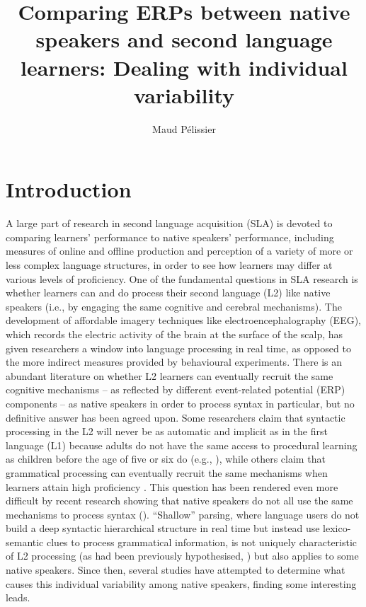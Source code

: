 \documentclass[output=paper,colorlinks,citecolor=brown,modfonts,nonflat]{../langscibook}
\author{Maud Pélissier\affiliation{University of Agder}\orcid{}}
\title{Comparing ERPs between native speakers and second language learners: Dealing with individual variability}
\begin{document}
\maketitle 
{}

\section{Introduction}
A large part of research in second language acquisition (SLA) is devoted to comparing learners’ performance to native speakers’ performance, including measures of online and offline production and perception of a variety of more or less complex language structures, in order to see how learners may differ at various levels of proficiency. One of the fundamental questions in SLA research is whether learners can and do process their second language (L2) like native speakers (i.e., by engaging the same cognitive and cerebral mechanisms). The development of affordable imagery techniques like electroencephalography (EEG), which records the electric activity of the brain at the surface of the scalp, has given researchers a window into language processing in real time, as opposed to the more indirect measures provided by behavioural experiments. There is an abundant literature on whether L2 learners can eventually recruit the same cognitive mechanisms – as reflected by different event-related potential (ERP) components – as native speakers in order to process syntax in particular, but no definitive answer has been agreed upon. Some researchers claim that syntactic processing in the L2 will never be as automatic and implicit as in the first language (L1) because adults do not have the same access to procedural learning as children before the age of five or six do (e.g., \citealt{Birdsong2006,ClahsenFelser2006,ClahsenFelser2018,Paradis2009}), while others claim that grammatical processing can eventually recruit the same mechanisms when learners attain high proficiency \citep{SteinhauerEtAl2009}. This question has been rendered even more difficult by recent research showing that native speakers do not all use the same mechanisms to process syntax (\citealt{TannerEtAl2013,TannerEtAl2014,TannerHell2014,Tanner2019}). “Shallow” parsing, where language users do not build a deep syntactic hierarchical structure in real time but instead use lexico-semantic clues to process grammatical information, is not uniquely characteristic of L2 processing (as had been previously hypothesised, \citealt{ClahsenFelser2006}) but also applies to some native speakers. Since then, several studies have attempted to determine what causes this individual variability among native speakers, finding some interesting leads.
\end{document}

